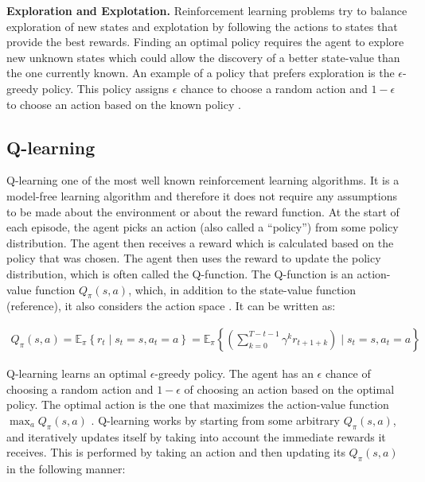 \textbf{Exploration and Explotation.}
Reinforcement learning problems try to balance exploration of new states and explotation by following the actions to states that provide the best rewards. Finding an optimal policy requires the agent to explore new unknown states which could allow the discovery of a better state-value than the one currently known. 
An example of a policy that prefers exploration is the $\epsilon$-greedy policy. This policy assigns $\epsilon$ chance to choose a random action and $1-\epsilon$ to choose an action based on the known policy \cite{sutton2018reinforcement}.  


\subsection{Q-learning} \label{chap2:q-learning}
Q-learning one of the most well known reinforcement learning algorithms. It is a model-free learning algorithm and therefore it does not require any assumptions to be made about the environment or about the reward function.
At the start of each episode, the agent picks an action (also called a “policy”) from some policy distribution. The agent then receives a reward which is calculated based on the policy that was chosen. The agent then uses the reward to update the policy distribution, which is often called the Q-function. The Q-function is an action-value function $Q_\pi(s,a)$, which, in addition to the state-value function (reference), it also considers the action space \cite{sutton2018reinforcement}. It can be written as:

\begin{align*}
    Q_{\pi}(s, a)=\mathbb{E}_{\pi}\left\{r_{t} \mid s_{t}=s, a_{t}=a\right\}=\mathbb{E}_{\pi}\left\{\left(\sum_{k=0}^{T-t-1} \gamma^{k} r_{t+1+k}\right) \mid s_{t}=s, a_{t}=a\right\}
\end{align*}

Q-learning learns an optimal $\epsilon$-greedy policy. The agent has an $\epsilon$ chance of choosing a random action and $1-\epsilon$ of choosing an action based on the optimal policy. The optimal action is the one that maximizes the action-value function $\max _{a} Q_{\pi}(s, a)$ . 
Q-learning works by starting from some arbitrary $Q_\pi(s,a)$, 
and iteratively updates itself by taking into account the immediate rewards it receives. This is performed by taking an action and then updating its $Q_\pi(s,a)$ 
in the following manner:

